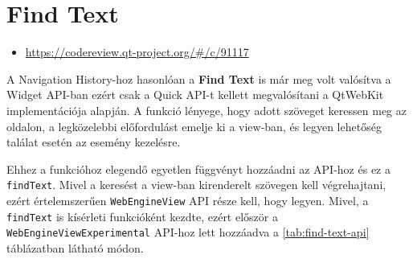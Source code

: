 \documentclass[12pt]{report}
\let\origurl\url
\renewcommand{\url}[1]{%
    \textcolor{blue}{\origurl{#1}}
}
\newcommand{\gerrit}[1]{%
    \textcolor{qtgreen}{\origurl{https://codereview.qt-project.org/\#/c/#1}}
}
\begin{document}
\section{Find Text}

\begin{center}
    \begin{reviewbox}
        \begin{itemize}
            \renewcommand{\labelitemi}{\textcolor{qtgreen}{$\blacktriangleright$}}
            \item \gerrit{91117}
        \end{itemize}
    \end{reviewbox}
\end{center}

\noindent
A Navigation History-hoz hasonlóan a \textbf{Find Text} is már meg volt valósítva a Widget
API-ban ezért csak a Quick API-t kellett megvalósítani a QtWebKit implementációja alapján.
A funkció lényege, hogy adott szöveget keressen meg az oldalon, a legközelebbi előfordulást
emelje ki a view-ban, és legyen lehetőség találat esetén az esemény kezelésre.

Ehhez a funkcióhoz elegendő egyetlen függvényt hozzáadni az API-hoz és ez a \\
\texttt{findText}. Mivel a keresést a view-ban kirenderelt szövegen kell végrehajtani,
ezért értelemszerűen \texttt{WebEngineView} API része kell, hogy legyen. Mivel, a
\texttt{findText} is kísérleti funkcióként kezdte, ezért először a
\texttt{WebEngineViewExperimental} API-hoz lett hozzáadva a \ref{tab:find-text-api}
táblázatban látható módon.
\end{document}
